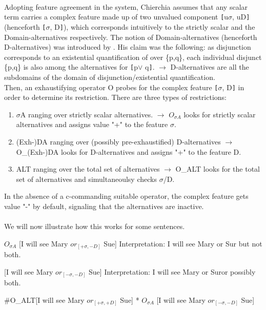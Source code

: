 \documentclass[a4paper,11pt]{article}
\begin{document}
\paragraph{}
Adopting feature agreement in the system, Chierchia assumes that any scalar term carries a complex feature made up of two unvalued component \verb![!u$\sigma$, uD\verb!]! (henceforth \verb![!$\sigma$, D\verb!]!), which corresponds intuitively to the strictly scalar and the Domain-alternatives respectively. The notion of Domain-alternatives  (henceforth D-alternatives) was introduced by \cite{Sau04}. His claim was the following: as disjunction corresponds to an existential quantification of over \{p,q\}, each individual disjunct \{p,q\} is also among the alternatives for \verb![!p$\vee$ q\verb!]!. $\rightarrow$ D-alternatives are all the subdomains of the domain of disjunction/existential quantification.
\\ Then, an exhaustifying operator O probes for the complex feature \verb![!$\sigma$, D\verb!]! in order to determine its restriction. There are three types of restrictions:

\begin{enumerate}
\item $\sigma$A ranging over strictly scalar alternatives. $\rightarrow$ $O_{\sigma A}$ looks for strictly scalar alternatives and assigns value "+" to the feature $\sigma$.
\item (Exh-)DA ranging over (possibly pre-exhaustified) D-alternatives $\rightarrow$ O_{(Exh-)DA} looks for D-alternatives and assigns "+" to the feature D.
\item ALT ranging over the total set of alternatives $\rightarrow$ O_{ALT} looks for the total set of alternatives and simultaneoulsy checks $\sigma$/D.
\end{enumerate}
In the absence of a c-commanding suitable operator, the complex feature  gets value "-" by default, signaling that the alternatives are inactive.
\paragraph{}
We will now illustrate how this works for some sentences.
\begin{exe}
\ex\label{oagree} \begin{xlist}
\ex\label{oagreea} \begin{xlist}
\ex\label{oagreeaa} $O_{\sigma A}$ [I will see Mary $or_{[+\sigma, -D]}$ Sue]
\ex\label{oagreeab} Interpretation: I will see Mary or Sur but not both.
\end{xlist}
\ex\label{oagreeb} \begin{xlist}
\ex\label{oagreeba} [I will see Mary $or_{[-\sigma, -D]}$ Sue]
\ex\label{oagreebb} Interpretation: I will see Mary or Suror possibly both.
\end{xlist}
\ex\label{oagreec} \#O_{ALT}[I will see Mary $or_{[+\sigma,+D]}$ Sue]
\ex\label{oagreed} * $O_{\sigma A}$ [I will see Mary $or_{[-\sigma, -D]}$ Sue]
\end{xlist}
\end{exe}
\end{document}
